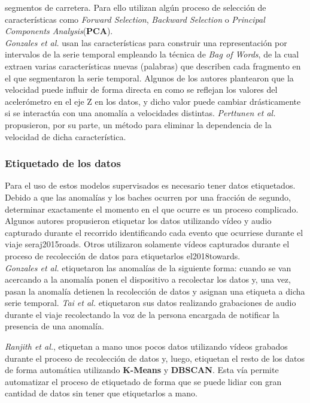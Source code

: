 			segmentos de carretera. Para ello utilizan algún proceso de selección de características como \emph{Forward Selection}, \emph{Backward Selection}
			o \emph{Principal Components Analysis}(\textbf{PCA}).\\
			\indent \emph{Gonzales et al.} usan las características para construir una representación por intervalos de la serie
			temporal empleando la técnica de \emph{Bag of Words}, de la cual extraen varias características nuevas (palabras) que describen cada fragmento
			en el que segmentaron la serie temporal. Algunos de los autores plantearon que la velocidad puede influir de forma directa en como se reflejan
			los valores del acelerómetro en el eje Z en los datos, y dicho valor puede cambiar drásticamente si se interactúa con una anomalía a velocidades
			distintas. \emph{Perttunen et al.}
			propusieron, por su parte, un método para eliminar la dependencia de la velocidad de dicha característica. 

		\subsubsection{Etiquetado de los datos}
			Para el uso de estos modelos supervisados es necesario tener datos etiquetados. Debido a que las anomalías y los baches ocurren por una 
			fracción de segundo, determinar exactamente el momento en el que ocurre es un proceso complicado. Algunos autores propusieron etiquetar
			los datos utilizando vídeo y audio capturado durante el recorrido identificando cada evento que ocurriese durante el viaje\brackcite
			{seraj2015roads}. Otros utilizaron solamente vídeos capturados durante el proceso de recolección de datos para etiquetarlos\brackcite
			{el2018towards}.\\
			\indent \emph{Gonzales et al.} etiquetaron las anomalías de la siguiente forma: cuando se van acercando a la
			anomalía ponen el dispositivo a recolectar los datos y, una vez, pasan la anomalía detienen la recolección de datos y asignan una etiqueta
			a dicha serie temporal. \emph{Tai et al.} etiquetaron sus datos realizando grabaciones de audio durante el
			viaje recolectando la voz de la persona encargada de notificar la presencia de una anomalía.

			\emph{Ranjith et al.}, etiquetan a mano unos pocos datos utilizando vídeos grabados durante el proceso
			de recolección de datos y, luego, etiquetan el resto de los datos de forma automática utilizando \textbf{K-Means} y \textbf{DBSCAN}. Esta vía 
			permite automatizar el proceso de etiquetado de forma que se puede lidiar con gran cantidad de datos sin tener que etiquetarlos a mano.


